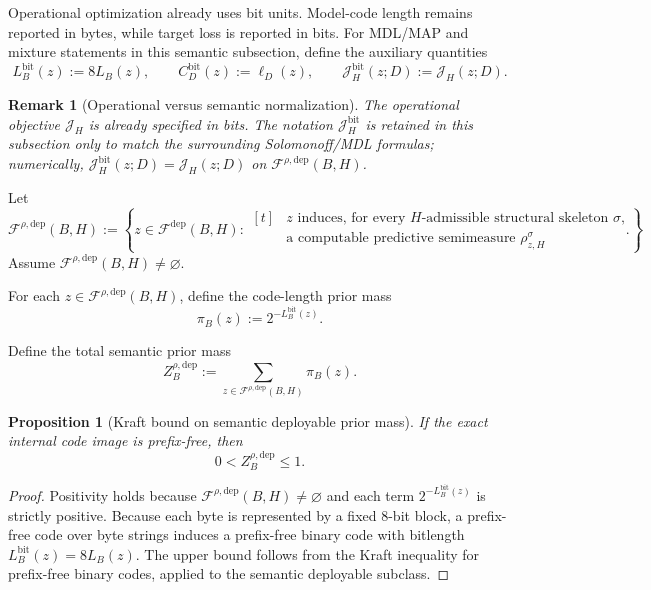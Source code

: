 \documentclass[11pt]{article}
\newtheorem{proposition}{Proposition}
\newtheorem{remark}{Remark}
\begin{document}
Operational optimization already uses bit units. Model-code length remains
reported in bytes, while target loss is reported in bits. For MDL/MAP and
mixture statements in this semantic subsection, define the auxiliary quantities
\[
L_B^{\mathrm{bit}}(z):=8L_B(z),
\qquad
C_D^{\mathrm{bit}}(z):=\ell_D(z),
\qquad
\mathcal{J}_H^{\mathrm{bit}}(z;D):=\mathcal{J}_H(z;D).
\]

\begin{remark}[Operational versus semantic normalization]
The operational objective $\mathcal{J}_H$ is already specified in bits. The
notation $\mathcal{J}_H^{\mathrm{bit}}$ is retained in this subsection only to
match the surrounding Solomonoff/MDL formulas; numerically,
$\mathcal{J}_H^{\mathrm{bit}}(z;D)=\mathcal{J}_H(z;D)$ on
$\mathcal{F}^{\rho,\mathrm{dep}}(B,H)$.
\end{remark}

Let
\[
\mathcal{F}^{\rho,\mathrm{dep}}(B,H)
:=
\left\{
z\in\mathcal{F}^{\mathrm{dep}}(B,H):
\begin{aligned}[t]
&z \text{ induces, for every $H$-admissible structural skeleton $\sigma$,}\\
&\text{a computable predictive semimeasure } \rho_{z,H}^{\sigma}
\end{aligned}
\right\}.
\]
Assume $\mathcal{F}^{\rho,\mathrm{dep}}(B,H)\neq\varnothing$.

For each $z\in\mathcal{F}^{\rho,\mathrm{dep}}(B,H)$, define the code-length
prior mass
\[
\pi_B(z):=2^{-L_B^{\mathrm{bit}}(z)}.
\]

Define the total semantic prior mass
\[
Z_B^{\rho,\mathrm{dep}}
:=
\sum_{z\in\mathcal{F}^{\rho,\mathrm{dep}}(B,H)} \pi_B(z).
\]

\begin{proposition}[Kraft bound on semantic deployable prior mass]
\label{prop:kraft-semantic}
If the exact internal code image is prefix-free, then
\[
0< Z_B^{\rho,\mathrm{dep}} \le 1.
\]
\end{proposition}

\begin{proof}
Positivity holds because
$\mathcal{F}^{\rho,\mathrm{dep}}(B,H)\neq\varnothing$ and each term
$2^{-L_B^{\mathrm{bit}}(z)}$ is strictly positive.
Because each byte is represented by a fixed 8-bit block, a prefix-free code
over byte strings induces a prefix-free binary code with bitlength
$L_B^{\mathrm{bit}}(z)=8L_B(z)$. The upper bound follows from the Kraft
inequality for prefix-free binary codes, applied to the semantic deployable
subclass.
\end{proof}
\end{document}
